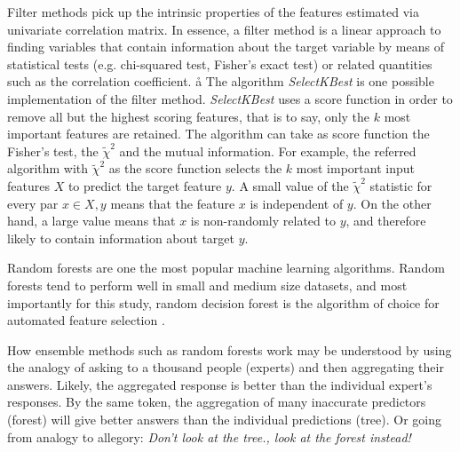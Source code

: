 \documentclass[preprint,12pt]{elsarticle}
\begin{document}
Filter methods pick up the intrinsic properties of the features estimated via univariate correlation matrix. In essence, a filter method is a linear approach to finding variables that contain information about the target variable by means of statistical tests (e.g. chi-squared test, Fisher's exact test) or related quantities such as the correlation coefficient.
å
The algorithm \emph{SelectKBest} \cite{scikit-learn} is one possible implementation of the filter method. \emph{SelectKBest} uses a score function in order to remove all but the highest scoring features, that is to say, only the $k$ most important features are retained. The algorithm can take as score function the Fisher's test, the $\tilde{\chi}^2$ and the mutual information. For example, the referred algorithm with $\tilde{\chi}^2$ as the score function selects the $k$ most important input features $X$ to predict the target feature $y$. A small value of the $\tilde{\chi}^2$ statistic for every par $x \in X,y$ means that the feature $x$ is independent of $y$. On the other hand, a large value means that $x$ is non-randomly related to $y$, and therefore likely to contain   information about target $y$.

Random forests are one the most popular machine learning algorithms. Random forests  tend to perform well in small and medium size datasets, and most importantly for this study, random decision forest is the algorithm of choice for automated feature selection \cite{breiman2001random}. 

How ensemble methods such as random forests work may be understood by using the analogy of asking to a thousand people (experts) and then aggregating their answers. Likely, the aggregated response is better than the individual expert’s responses. By the same token, the aggregation of many inaccurate predictors (forest) will give better answers than the individual predictions (tree). Or going from analogy to allegory: \emph{Don’t look at the tree., look at the forest instead!}
\end{document}
